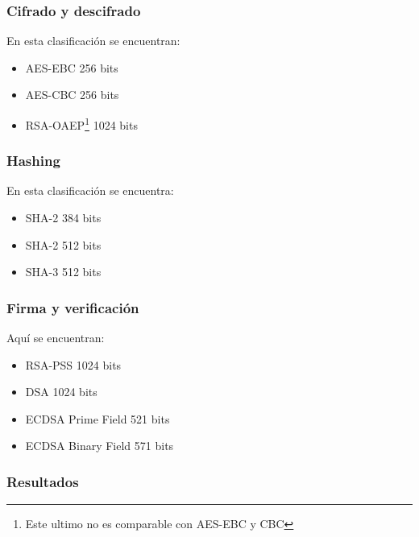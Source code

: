 \documentclass[../main.tex]{subfiles}
\begin{document}
\subsubsection{Cifrado y descifrado}\label{sec:cifrado-y-descifrado}
En esta clasificación se encuentran:
\begin{multicols}{2}
\begin{itemize}
  \item AES-EBC 256 bits
  \item AES-CBC 256 bits
  \item RSA-OAEP\footnote{Este ultimo no es comparable con AES-EBC y CBC} 1024 bits
\end{itemize}
\subsubsection{Hashing}\label{hashing}
En esta clasificación se encuentra:
\begin{itemize}
  \item SHA-2 384 bits
  \item SHA-2 512 bits
  \item SHA-3 512 bits
\end{itemize}
\subsubsection{Firma y verificación}\label{firma-y-verificacion}
Aquí se encuentran:
\begin{itemize}
  \item RSA-PSS 1024 bits
  \item DSA 1024 bits
  \item ECDSA Prime Field 521 bits
  \item ECDSA Binary Field 571 bits
\end{itemize}
\end{multicols}

\newpage{}

\subsubsection{Resultados}\label{sec:resultados}
\end{document}
